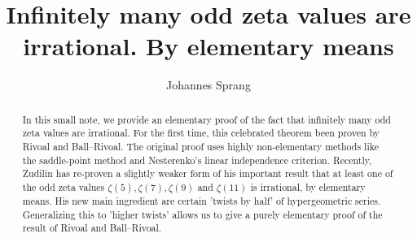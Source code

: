 \documentclass[11pt]{amsart}
\title[Infinitely many odd zeta values are irrational. By elementary means]{Infinitely many odd zeta values are irrational. By elementary means}
\author{Johannes Sprang}
\date{}
\theoremstyle{plain}
\theoremstyle{remark}
\theoremstyle{definition}
\begin{document}
\begin{abstract}
In this small note, we provide an elementary proof of the fact that infinitely many odd zeta values are irrational. For the first time, this celebrated theorem been proven by Rivoal and Ball--Rivoal. The original proof uses highly non-elementary methods like the saddle-point method and Nesterenko's linear independence criterion. Recently, Zudilin has re-proven a slightly weaker form of his important result that at least one of the odd zeta values $\zeta(5),\zeta(7),\zeta(9)$ and $\zeta(11)$ is irrational, by elementary means. His new main ingredient are certain 'twists by half' of hypergeometric series. Generalizing this to 'higher twists' allows us to give a purely elementary proof of the result of Rivoal and Ball--Rivoal.
\end{abstract}
\end{document}

